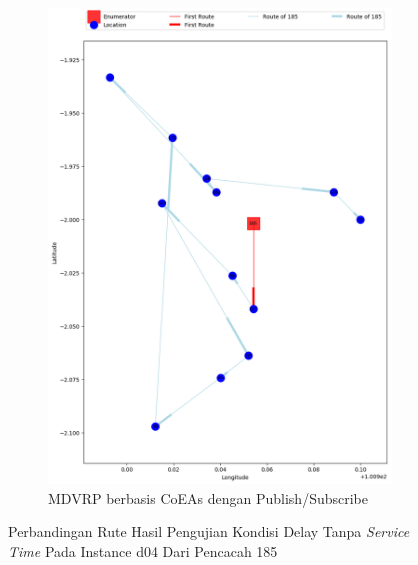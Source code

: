 \begin{figure}[H]\ContinuedFloat
	\centering
	\begin{subfigure}[t]{\textwidth}
		\centering
		\includegraphics[width=\textwidth]{Resources/Images/delayed_4/real_m15_n100_delayed_4_185_pubsub_coes}
		\caption{MDVRP berbasis CoEAs dengan Publish/Subscribe}
		\label{fig:real_m15_n100_delayed_4_185_pubsub_coes}
	\end{subfigure}
	\caption{Perbandingan Rute Hasil Pengujian Kondisi Delay Tanpa \textit{Service Time} Pada Instance d04 Dari Pencacah 185}
	\label{fig:real_m15_n100_delayed_4_185_contd}
\end{figure}


